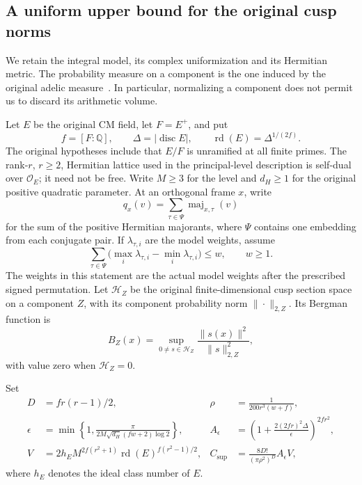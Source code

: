 \subsection{A uniform upper bound for the original cusp norms}
\label{shared-bergman-actual-upper}

We retain the integral model, its complex uniformization and its
Hermitian metric.  The probability measure on a component is the one
induced by the original adelic measure~\cite{bergman-upper-source}.
In particular, normalizing a
component does not permit us to discard its arithmetic volume.

Let $E$ be the original CM field, let $F=E^+$, and put
\[
 f=[F:\mathbb Q],\qquad \Delta=|\operatorname{disc}E|,
 \qquad \operatorname{rd}(E)=\Delta^{1/(2f)}.
\]
The original hypotheses include that $E/F$ is unramified at all finite
primes.  The rank-$r$, $r\ge2$, Hermitian lattice used in the principal-level
description is self-dual over $\mathcal O_E$; it need not be free.
Write $M\ge3$ for the level and $d_H\ge1$ for the original positive
quadratic parameter.  At an orthogonal frame $x$, write
\[
 q_x(v)=\sum_{\tau\in\Psi}\operatorname{maj}_{x,\tau}(v)
\]
for the sum of the positive Hermitian majorants, where $\Psi$ contains
one embedding from each conjugate pair.  If $\lambda_{\tau,i}$ are
the model weights, assume
\[
 \sum_{\tau\in\Psi}
 \bigl(\max_i\lambda_{\tau,i}-\min_i\lambda_{\tau,i}\bigr)
 \le w,\qquad w\ge1.
\]
The weights in this statement are the actual model weights after the
prescribed signed permutation.  Let $\mathcal H_Z$ be the original
finite-dimensional cusp section space on a component $Z$, with its
component probability norm $\|\cdot\|_{2,Z}$.  Its Bergman function is
\[
 B_Z(x)=\sup_{0\ne s\in\mathcal H_Z}
              \frac{\|s(x)\|^2}{\|s\|_{2,Z}^2},
\]
with value zero when $\mathcal H_Z=0$.

Set
\begin{align}
 D&=fr(r-1)/2,&
 \rho&=\frac1{200r^3(w+f)},\label{eq:actual-upper-radius}\\
 \epsilon&=\min\left\{1,
 \frac{\pi}{2M\sqrt{d_H}(fw+2)\log2}\right\},&
 A_\epsilon&=
 \left(1+\frac{2(2fr)^2\Delta}{\epsilon}\right)^{2fr^2},
 \label{eq:actual-upper-multiplicity}\\
 V&=2h_E M^{2f(r^2+1)}
       \operatorname{rd}(E)^{f(r^2-1)/2},&
 C_{\mathrm{sup}}&=
       \frac{8D!}{(\pi\rho^2)^D}A_\epsilon V,
 \label{eq:actual-upper-constant}
\end{align}
where $h_E$ denotes the ideal class number of $E$.

